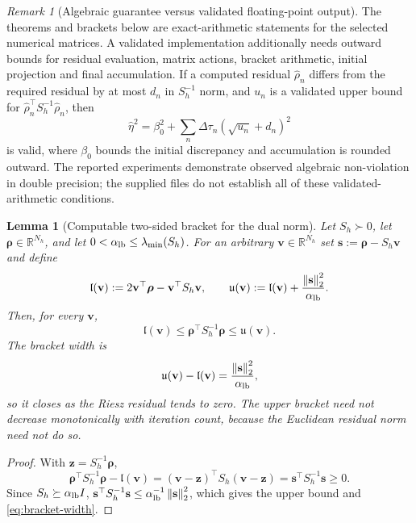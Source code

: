 \documentclass[11pt]{amsart}
\newtheorem{lemma}[theorem]{Lemma}
\theoremstyle{remark}
\newtheorem{remark}[theorem]{Remark}
\newcommand{\R}{\mathbb{R}}
\newcommand{\Sh}{S_h}
\newcommand{\norm}[1]{\left\lVert #1\right\rVert}
\newcommand{\rr}{\bm\rho}
\newcommand{\vv}{\mathbf v}
\newcommand{\zz}{\mathbf z}
\newcommand{\sres}{\mathbf s}
\begin{document}
\begin{remark}[Algebraic guarantee versus validated floating-point output]
\label{rem:arithmetic-scope}
The theorems and brackets below are exact-arithmetic statements for the
selected numerical matrices. A validated implementation additionally needs
outward bounds for residual evaluation, matrix actions, bracket arithmetic,
initial projection and final accumulation. If a computed residual
$\widehat\rho_n$ differs from the required residual by at most $d_n$ in
$S_h^{-1}$ norm, and $u_n$ is a validated upper bound for
$\widehat\rho_n^\top S_h^{-1}\widehat\rho_n$, then
\[
 \widehat\eta^2=\beta_0^2+\sum_n\Delta\tau_n
                (\sqrt{u_n}+d_n)^2
\]
is valid, where $\beta_0$ bounds the initial discrepancy and accumulation
is rounded outward. The reported experiments demonstrate observed algebraic
non-violation in double precision; the supplied files do not establish all
of these validated-arithmetic conditions.
\end{remark}

\begin{lemma}[Computable two-sided bracket for the dual norm]
\label{lem:guaranteed}
Let $\Sh\succ0$, let $\rr\in\R^{N_h}$, and let
$0<\alpha_{\rm lb}\le\lambda_{\min}(\Sh)$.  For an arbitrary
$\vv\in\R^{N_h}$ set $\sres:=\rr-\Sh\vv$ and define
\begin{equation}
  \mathfrak l(\vv):=2\vv^\top\rr-\vv^\top\Sh\vv,
  \qquad
  \mathfrak u(\vv):=\mathfrak l(\vv)
    +\frac{\norm{\sres}_2^2}{\alpha_{\rm lb}}.
  \label{eq:riesz-bracket-def}
\end{equation}
Then, for every $\vv$,
\begin{equation}
 \boxed{
   \mathfrak l(\vv)
   \le \rr^\top\Sh^{-1}\rr
   \le \mathfrak u(\vv).}
 \label{eq:riesz-bracket}
\end{equation}
The bracket width is
\begin{equation}
  \mathfrak u(\vv)-\mathfrak l(\vv)
  =\frac{\norm{\sres}_2^2}{\alpha_{\rm lb}},
  \label{eq:bracket-width}
\end{equation}
so it closes as the Riesz residual tends to zero. The upper bracket need
not decrease monotonically with iteration count, because the Euclidean
residual norm need not do so.
\end{lemma}

\begin{proof}
With $\zz=\Sh^{-1}\rr$,
\[
 \rr^\top\Sh^{-1}\rr-\mathfrak l(\vv)
 = (\vv-\zz)^\top\Sh(\vv-\zz)
 = \sres^\top\Sh^{-1}\sres\ge0.
\]
Since $\Sh\succeq\alpha_{\rm lb}I$,
$\sres^\top\Sh^{-1}\sres\le
\alpha_{\rm lb}^{-1}\norm{\sres}_2^2$, which gives the upper bound and
\eqref{eq:bracket-width}.
\end{proof}
\end{document}
